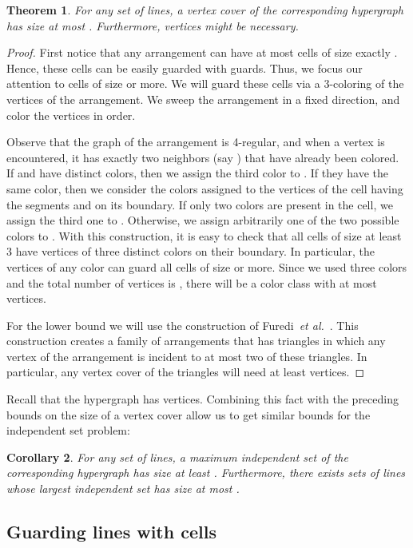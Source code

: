 \documentclass[11pt,a4paper]{article}
\newtheorem{theorem}{Theorem}
\newtheorem{corollary}[theorem]{Corollary}
\begin{document}
\begin{theorem}\label{LB:guards}
For any set  of  lines, a vertex cover of the corresponding  hypergraph has size at most . Furthermore,  vertices might be necessary.
\end{theorem}
\begin{proof}
First notice that any arrangement can have at most  cells of size exactly . Hence, these cells can be easily guarded with  guards. Thus, we focus our attention to cells of size  or more. We will guard these cells via a 3-coloring of the vertices of the arrangement. We sweep the arrangement in a fixed direction, and color the vertices in order. 

Observe that the graph of the arrangement is 4-regular, and when a vertex  is encountered, it has exactly two neighbors (say ) that have already been colored. If  and  have distinct colors, then we assign the third color to . If they have the same color, then we consider the colors assigned to the vertices of the cell having the segments  and  on its boundary. If only two colors are present in the cell, we assign the third one to . Otherwise, we assign arbitrarily one of the two possible colors to . With this construction, it is easy to check that all cells of size at least 3 have vertices of three distinct colors on their boundary. In particular, the vertices of any color can guard all cells of size  or more. Since we used three colors and the total number of vertices is , there will be a color class with at most  vertices.

For the lower bound we will use the construction of Furedi~\emph{et al.}~\cite{furedi}. This construction creates a family of arrangements that has  triangles in which any vertex of the arrangement is incident to at most two of these triangles. In particular, any vertex cover of the triangles will need at least  vertices.
\end{proof}

Recall that the hypergraph  has  vertices. Combining this fact with the preceding bounds on the size of a vertex cover allow us to get similar bounds for the independent set problem:  
\begin{corollary}\label{cor:VCIS}
For any set  of  lines, a maximum independent set of the corresponding  hypergraph has size at least . Furthermore, there exists sets of lines whose largest independent set has size at most .
\end{corollary}

\subsection{Guarding lines with cells}
\end{document}
